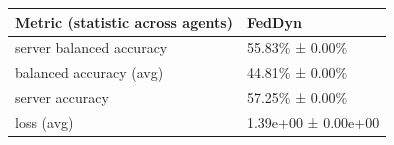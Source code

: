 \begin{tabular}{ll}
\hline
 Metric (statistic across agents)   & FedDyn              \\
\hline
 server balanced accuracy           & 55.83\% ± 0.00\%      \\
 balanced accuracy (avg)            & 44.81\% ± 0.00\%      \\
 server accuracy                    & 57.25\% ± 0.00\%      \\
 loss (avg)                         & 1.39e+00 ± 0.00e+00 \\
\hline
\end{tabular}